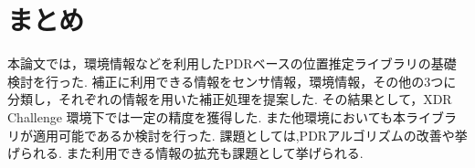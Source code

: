 

\section{まとめ}
本論文では，環境情報などを利用したPDRベースの位置推定ライブラリの基礎検討を行った.
補正に利用できる情報をセンサ情報，環境情報，その他の3つに分類し，それぞれの情報を用いた補正処理を提案した.
その結果として，XDR Challenge 環境下では一定の精度を獲得した.
また他環境においても本ライブラリが適用可能であるか検討を行った.
課題としては,PDRアルゴリズムの改善や挙げられる.
また利用できる情報の拡充も課題として挙げられる.

